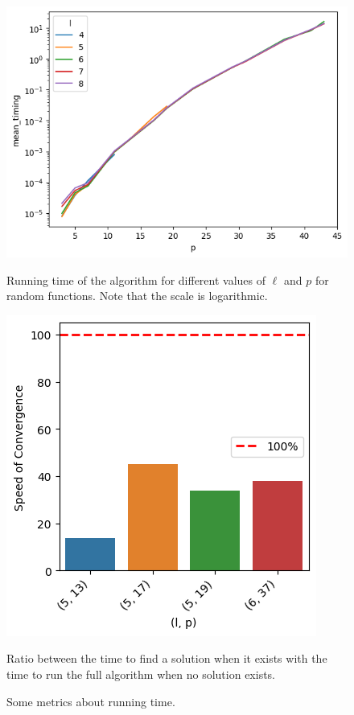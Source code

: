 \begin{figure}
    \centering
    \begin{minipage}{0.55\textwidth}
        \centering
        \includegraphics[width=\linewidth]{img/p_encodings/lineplot_timings.png}
        \caption{Running time of the algorithm for different values of $\ell$ and $p$ for random functions. Note that the scale is logarithmic.}        
        \label{fig:lineplot_timings}
        \end{minipage}\hspace{0.04\textwidth}
    \begin{minipage}{0.35\textwidth}
        \centering
        \includegraphics[width=\linewidth]{img/p_encodings/barplot.png}
        \caption{Ratio between the time to find a solution when it exists with the time to run the full algorithm when no solution exists.}
        \label{fig:barplot_ratio}
    \end{minipage}
    \caption{Some metrics about running time.}
    \label{fig:overall}
\end{figure}
